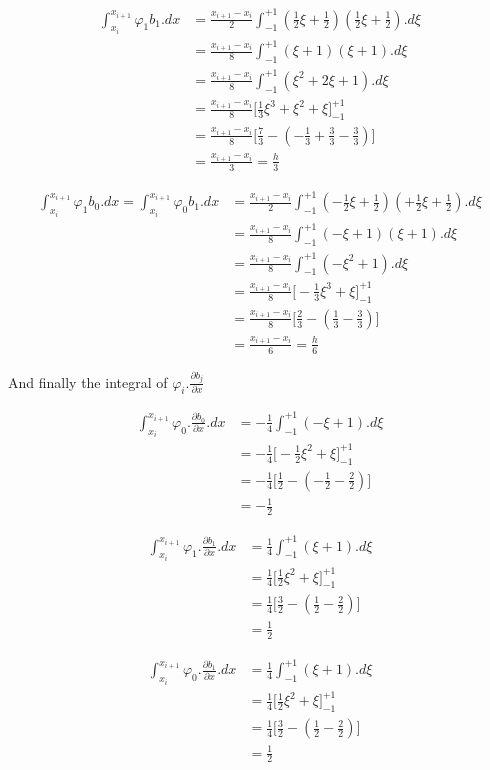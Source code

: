 \documentclass[11pt,letterpaper,titlepage]{article}
\numberwithin{equation}{section}
\newcommand{\beq}{\begin{equation*}
\begin{aligned}}
\newcommand{\eeq}{\end{aligned}
\end{equation*}}
\begin{document}
\begin{appendices}
\beq
\int_{x_i}^{x_{i+1}} \varphi_1 b_1.dx &= \frac{x_{i+1}-x_i}{2} \int_{-1}^{+1} (\frac{1}{2}\xi+\frac{1}{2})(\frac{1}{2}\xi+\frac{1}{2}) .d\xi \\
&=  \frac{x_{i+1}-x_i}{8} \int_{-1}^{+1} (\xi +1 )(\xi +1).d\xi \\
&=  \frac{x_{i+1}-x_i}{8} \int_{-1}^{+1} (\xi^2+2\xi+1 ).d\xi \\
&=  \frac{x_{i+1}-x_i}{8} \biggr[  \frac{1}{3}\xi^3 +\xi^2+\xi  \biggr]_{-1}^{+1}\\
&= \frac{x_{i+1}-x_i}{8} \biggr[  \frac{7}{3} - (-\frac{1}{3}+\frac{3}{3} -\frac{3}{3}) \biggr]\\
&=  \frac{x_{i+1}-x_i}{3} = \frac{h}{3}
\eeq 

\beq
\int_{x_i}^{x_{i+1}} \varphi_1 b_0.dx = 
\int_{x_i}^{x_{i+1}} \varphi_0 b_1.dx &= \frac{x_{i+1}-x_i}{2} \int_{-1}^{+1} (-\frac{1}{2}\xi+\frac{1}{2})(+\frac{1}{2}\xi+\frac{1}{2}) .d\xi \\
&=  \frac{x_{i+1}-x_i}{8} \int_{-1}^{+1} (-\xi +1 )(\xi +1).d\xi \\
&=  \frac{x_{i+1}-x_i}{8} \int_{-1}^{+1} (-\xi^2+1 ).d\xi \\
&=  \frac{x_{i+1}-x_i}{8} \biggr[  -\frac{1}{3}\xi^3 +\xi  \biggr]_{-1}^{+1}\\
&= \frac{x_{i+1}-x_i}{8} \biggr[  \frac{2}{3} - (\frac{1}{3} -\frac{3}{3}) \biggr]\\
&=  \frac{x_{i+1}-x_i}{6} = \frac{h}{6}
\eeq 

And finally the integral of $\varphi_i.\frac{\partial b_j}{\partial x}$

\beq
\int_{x_i}^{x_{i+1}} \varphi_0.\frac{\partial b_0}{\partial x}.dx 
&= -\frac{1}{4}\int_{-1}^{+1} (-\xi +1).d\xi \\
&=-\frac{1}{4} \biggr[ -\frac{1}{2}\xi^2 + \xi   \biggr]_{-1}^{+1}\\
&=-\frac{1}{4} \biggr[ \frac{1}{2} - (- \frac{1}{2} -\frac{2}{2})  \biggr] \\
&=-\frac{1}{2}
\eeq 

\beq
\int_{x_i}^{x_{i+1}} \varphi_1.\frac{\partial b_1}{\partial x}.dx 
&= \frac{1}{4}\int_{-1}^{+1} (\xi +1).d\xi \\
&=\frac{1}{4} \biggr[ \frac{1}{2}\xi^2 + \xi   \biggr]_{-1}^{+1}\\
&=\frac{1}{4} \biggr[ \frac{3}{2} - ( \frac{1}{2} -\frac{2}{2})  \biggr] \\
&=\frac{1}{2}
\eeq 

\beq
\int_{x_i}^{x_{i+1}} \varphi_0.\frac{\partial b_1}{\partial x}.dx 
&= \frac{1}{4}\int_{-1}^{+1} (\xi +1).d\xi \\
&=\frac{1}{4} \biggr[ \frac{1}{2}\xi^2 + \xi   \biggr]_{-1}^{+1}\\
&=\frac{1}{4} \biggr[ \frac{3}{2} - (\frac{1}{2} -\frac{2}{2})  \biggr] \\
&=\frac{1}{2}
\eeq 


\end{appendices}
\end{document}
